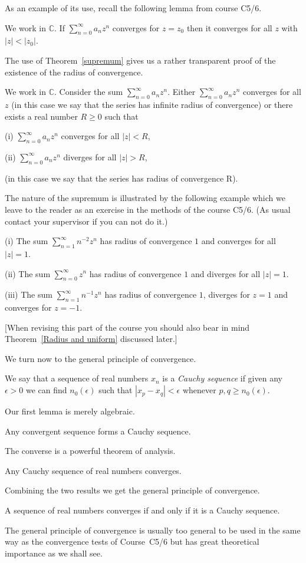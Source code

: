 As an example of its use, recall the following lemma
from course C5/6.
\begin{lemma} We work in ${\mathbb C}$.
If $\sum_{n=0}^{\infty}a_{n}z^{n}$ converges
for $z=z_{0}$ then it converges for all $z$ with
$|z|<|z_{0}|$.
\end{lemma}
The use of Theorem~\ref{supremum} gives us a rather
transparent proof of the existence of the radius of convergence.
\begin{theorem} We work in ${\mathbb C}$. Consider
the sum $\sum_{n=0}^{\infty}a_{n}z^{n}$. Either
$\sum_{n=0}^{\infty}a_{n}z^{n}$ converges for all
$z$ (in this case we say that the series has infinite radius of
convergence) or there exists a real number $R\geq 0$
such that

(i) $\sum_{n=0}^{\infty}a_{n}z^{n}$ converges for all $|z|<R$,

(ii) $\sum_{n=0}^{\infty}a_{n}z^{n}$ diverges for all $|z|>R$,

\noindent (in this case we say that the series has radius of
convergence R).
\end{theorem}

The nature of the supremum is illustrated by the
following example which we leave to the reader as an
exercise in the methods of the course C5/6. (As usual
contact your supervisor if you can not do it.)
\begin{example}\label{on and off}
(i) The sum $\sum_{n=1}^{\infty}n^{-2}z^{n}$
has radius of convergence $1$ and converges for all $|z|=1$.

(ii) The sum $\sum_{n=0}^{\infty}z^{n}$
has radius of convergence $1$ and diverges for all $|z|=1$.

(iii) The sum $\sum_{n=1}^{\infty}n^{-1}z^{n}$
has radius of convergence $1$, diverges for $z=1$
and converges for $z=-1$.
\end{example}
[When revising this part of the course you should also bear in
mind Theorem~\ref{Radius and uniform} discussed later.]

We turn now to the general principle of convergence.
\begin{definition}\label{one Cauchy sequence} 
We say that a sequence of real numbers
$x_{n}$ is a \emph{Cauchy sequence} if given any
$\epsilon>0$ we can find $n_{0}(\epsilon)$ such that
$|x_{p}-x_{q}|<\epsilon$ whenever $p,q\geq n_{0}(\epsilon)$.
\end{definition}
Our first lemma is merely algebraic. 
\begin{lemma} Any convergent sequence forms a Cauchy sequence.
\end{lemma}
The converse is a powerful theorem of analysis.
\begin{theorem} Any Cauchy sequence of real numbers
converges.
\end{theorem}
Combining the two results we get the general principle
of convergence.
\begin{theorem}\label{Cauchy}
A sequence of real numbers converges if and only if
it is a Cauchy sequence.
\end{theorem}
The general principle of convergence is usually
too general to
be used in the same way as
the convergence tests of Course~C5/6
but has great theoretical importance as we shall see.

